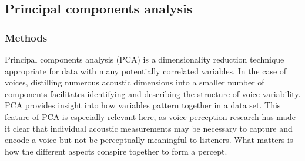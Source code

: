 




\subsection{Principal components analysis}\label{ch3:sec:pca}
\subsubsection{Methods}
Principal components analysis (PCA) is a dimensionality reduction technique appropriate for data with many potentially correlated variables. In the case of voices, distilling numerous acoustic dimensions into a smaller number of components facilitates identifying and describing the structure of voice variability. PCA provides insight into how variables pattern together in a data set. This feature of PCA is especially relevant here, as voice perception research has made it clear that individual acoustic measurements may be necessary to capture and encode a voice but not be perceptually meaningful to listeners. What matters is how the different aspects conspire together to form a percept. %

